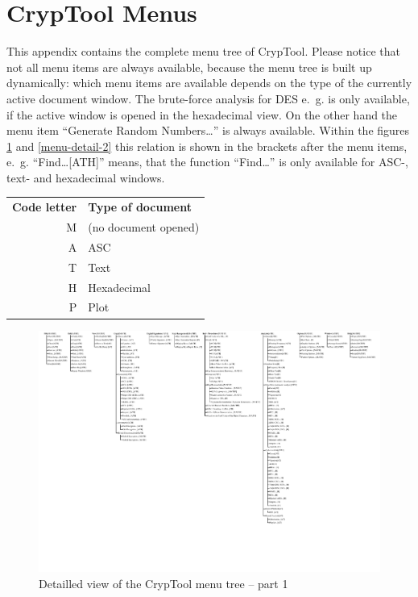 
\pagebreak
\enlargethispage{1cm}
\section{CrypTool Menus}
\hypertarget{appendix-menutree}{}\label{s:appendix-menutree}
This appendix contains the complete menu tree of CrypTool. 
Please notice that not all menu items are always available, because the
menu tree is built up dynamically: which menu items are available depends
on the type of the currently active document window.
The brute-force analysis for DES e.~g. is only available, if the active
window is opened in the hexadecimal view. On the other hand the menu item
"`Generate Random Numbers\dots"' is always available. 
Within the figures \ref{menu-detail-1} and \ref{menu-detail-2} 
this relation is shown in the brackets after the menu items,
e.~g. "`Find\dots[ATH]"' means, that the function "`Find\dots"' is only
available for ASC-, text- and hexadecimal windows.
\begin{center}
\begin{tabular}{rl}
\bf Code letter & \bf Type of document \\
M & (no document opened)\\
A & ASC\\
T & Text\\
H & Hexadecimal\\
P & Plot\\
\end{tabular}
\end{center}

\nobreak

\begin{figure}[!hb]
\begin{center}
\includegraphics[scale=1.1, clip, viewport=10 360 400 600]{figures/cryptool-menu-detail-en}
\caption{Detailled view of the CrypTool menu tree -- part 1}
\label{menu-detail-1}
\end{center}
\end{figure}

